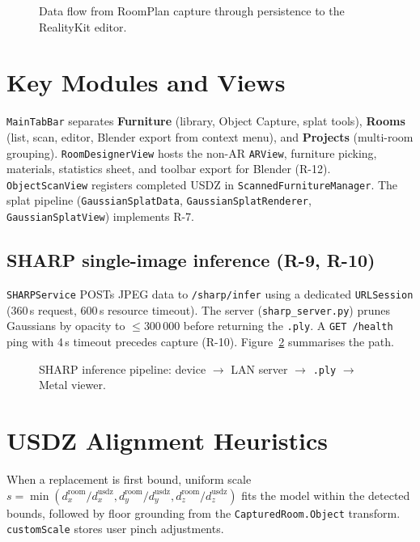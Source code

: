 \begin{figure}[htbp]
\centering
{}
\caption{Data flow from RoomPlan capture through persistence to the RealityKit editor.}
\label{fig:dataflow}
\end{figure}

\section{Key Modules and Views}

\texttt{MainTabBar} separates \textbf{Furniture} (library, Object Capture, splat tools), \textbf{Rooms} (list, scan, editor, Blender export from context menu), and \textbf{Projects} (multi-room grouping). \texttt{RoomDesignerView} hosts the non-AR \texttt{ARView}, furniture picking, materials, statistics sheet, and toolbar export for Blender (R-12). \texttt{ObjectScanView} registers completed USDZ in \texttt{ScannedFurnitureManager}. The splat pipeline (\texttt{GaussianSplatData}, \texttt{GaussianSplatRenderer}, \texttt{GaussianSplatView}) implements R-7.

\subsection{SHARP single-image inference (R-9, R-10)}
\label{sec:sharp}

\texttt{SHARPService} POSTs JPEG data to \texttt{/sharp/infer} using a dedicated \texttt{URLSession} (360\,s request, 600\,s resource timeout). The server (\texttt{sharp\_server.py}) prunes Gaussians by opacity to $\leq 300\,000$ before returning the \texttt{.ply}. A \texttt{GET /health} ping with 4\,s timeout precedes capture (R-10). Figure~\ref{fig:sharp_pipeline} summarises the path.

\begin{figure}[htbp]
\centering
{}
\caption{SHARP inference pipeline: device $\rightarrow$ LAN server $\rightarrow$ \texttt{.ply} $\rightarrow$ Metal viewer.}
\label{fig:sharp_pipeline}
\end{figure}

\section{USDZ Alignment Heuristics}
\label{sec:alignment}

When a replacement is first bound, uniform scale $s = \min(d_x^{\mathrm{room}}/d_x^{\mathrm{usdz}}, d_y^{\mathrm{room}}/d_y^{\mathrm{usdz}}, d_z^{\mathrm{room}}/d_z^{\mathrm{usdz}})$ fits the model within the detected bounds, followed by floor grounding from the \texttt{CapturedRoom.Object} transform. \texttt{customScale} stores user pinch adjustments.


